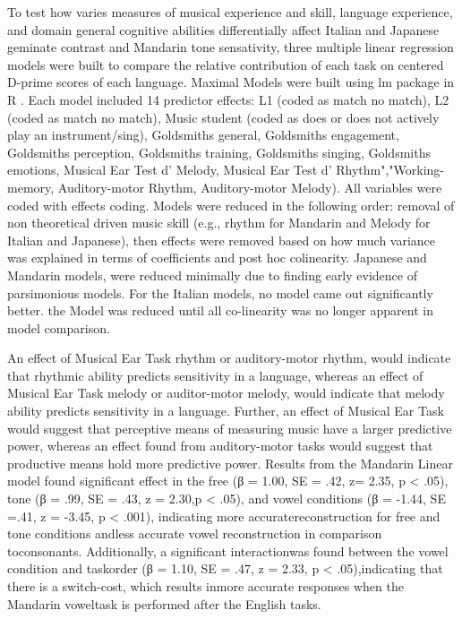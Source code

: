 \documentclass[a4paper]{article}
\begin{document}
To test how varies measures of musical experience and skill, language experience, and domain general cognitive abilities differentially affect Italian and Japanese geminate contrast and Mandarin tone sensativity, three multiple linear regression models were built to compare the relative contribution of each task on centered D-prime scores of each language. Maximal Models were built using lm package \cite{lmPackage} in R \cite{RManual}. Each model included 14 predictor effects: L1 (coded as match no match), L2 (coded as match no match), Music student (coded as does or does not actively play an instrument/sing), Goldsmiths general, Goldsmiths engagement, Goldsmiths perception, Goldsmiths training, Goldsmiths singing, Goldsmiths emotions, Musical Ear Test d' Melody, Musical Ear Test d' Rhythm","Working-memory, Auditory-motor Rhythm, Auditory-motor Melody). All variables were coded with effects coding. Models were reduced in the following order: removal of non theoretical driven music skill (e.g., rhythm for Mandarin and Melody for Italian and Japanese), then effects were removed based on how much variance was explained in terms of coefficients and post hoc colinearity. Japanese and Mandarin models, were reduced minimally due to finding early evidence of parsimonious models. For the Italian models, no model came out significantly better. the Model was reduced until all co-linearity was no longer apparent in model comparison.  

An effect of Musical Ear Task rhythm or auditory-motor rhythm, would indicate that rhythmic ability predicts sensitivity in a language, whereas an effect of Musical Ear Task melody or auditor-motor melody, would indicate that melody ability predicts sensitivity in a language. Further, an effect of Musical Ear Task would suggest that perceptive means of measuring music have a larger predictive power, whereas an effect found from auditory-motor tasks would suggest that productive means hold more predictive power. Results from the Mandarin Linear model found significant effect in the free (β = 1.00, SE = .42, z= 2.35, p < .05), tone (β = .99, SE = .43, z = 2.30,p < .05), and vowel conditions (β = -1.44, SE =.41, z = -3.45, p < .001), indicating more accuratereconstruction for free and tone conditions andless accurate vowel reconstruction in comparison toconsonants. Additionally, a significant interactionwas found between the vowel condition and taskorder (β = 1.10, SE = .47, z = 2.33, p < .05),indicating that there is a switch-cost, which results inmore accurate responses when the Mandarin voweltask is performed after the English tasks. 
\end{document}
